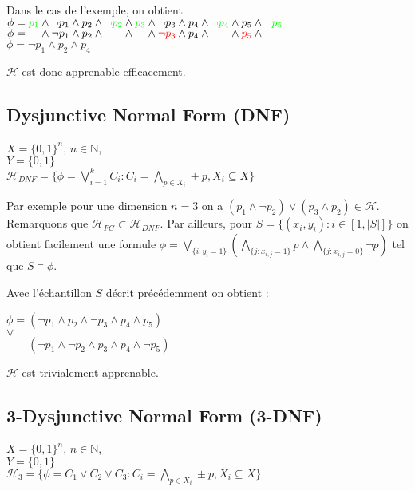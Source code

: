 \documentclass{article}
\theoremstyle{plain}
\theoremstyle{remark}
\theoremstyle{definition}
\begin{document}
Dans le cas de l'exemple, on obtient :\\
$\phi = \textcolor{green}{p_1} \land \neg p_1 \land p_2 \land \textcolor{green}{\neg p_2} \land \textcolor{green}{p_3} \land \neg p_3 \land p_4 \land \textcolor{green}{\neg p_4} \land p_5 \land \textcolor{green}{\neg p_5}$\\
$\phi = \phantom{p_1} \land \neg p_1 \land p_2 \land \phantom{\neg p_2} \land \phantom{p_3} \land \textcolor{red}{\neg p_3} \land p_4 \land \phantom{\neg p_4} \land \textcolor{red}{p_5} \land \phantom{\neg p_5}$\\
$\phi = \neg p_1 \land p_2 \land p_4$

$\mathcal{H}$ est donc apprenable efficacement.

\subsection{Dysjunctive Normal Form (DNF)}

$X=\{0,1\}^n$, $n\in \mathbb{N}$,\\
$Y=\{0,1\}$\\
$\mathcal{H}_{DNF}=\{\phi = \bigvee_{i=1}^k C_i : C_i=\bigwedge_{p\in X_i} \pm p, X_i\subseteq X\}$

Par exemple pour une dimension $n=3$ on a $(p_1\land \neg p_2)\lor (p_3\land p_2)\in \mathcal{H}$. Remarquons que $\mathcal{H}_{FC}\subset\mathcal{H}_{DNF}$. Par ailleurs, pour $S=\{(x_i,y_i) : i\in [1,|S|]\}$ on obtient facilement une formule $\phi = \bigvee_{\{i:y_i=1\}} (\bigwedge_{\{j:x_{i,j}=1\}} p \land \bigwedge_{\{j:x_{i,j}=0\}} \neg p)$ tel que $S\models \phi$.

Avec l'échantillon $S$ décrit précédemment on obtient :

\begin{centering}
$\phi = (\neg p_1\land p_2\land\neg p_3\land p_4\land p_5)$\\
$\lor$\\
$\phantom{\phi =}(\neg p_1\land\neg p_2\land p_3\land p_4\land\neg p_5)$\\
\end{centering}

$\mathcal{H}$ est trivialement apprenable.

\subsection{3-Dysjunctive Normal Form (3-DNF)}

$X=\{0,1\}^n$, $n\in \mathbb{N}$,\\
$Y=\{0,1\}$\\
$\mathcal{H}_3=\{\phi = C_1\lor C_2\lor C_3 : C_i=\bigwedge_{p\in X_i} \pm p, X_i\subseteq X\}$
\end{document}
